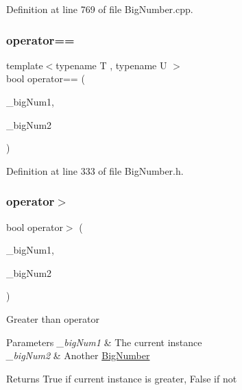 Definition at line 769 of file Big\+Number.\+cpp.

\mbox{\label{class_big_nums_1_1_big_number_add1b48504a6361ebffcef3c2b9fb5958}} 
\subsubsection{\texorpdfstring{operator==}{operator==}\hspace{0.1cm}{\footnotesize\ttfamily [2/2]}}
{\footnotesize\ttfamily template$<$typename T , typename U $>$ \\
bool operator== (\begin{DoxyParamCaption}\item[{const T \&}]{\+\_\+big\+Num1,  }\item[{const U \&}]{\+\_\+big\+Num2 }\end{DoxyParamCaption})\hspace{0.3cm}{\ttfamily [friend]}}



Definition at line 333 of file Big\+Number.\+h.

\mbox{\label{class_big_nums_1_1_big_number_a73fd242189f8c8439d4f001681d1ae51}} 
\subsubsection{\texorpdfstring{operator$>$}{operator>}}
{\footnotesize\ttfamily bool operator$>$ (\begin{DoxyParamCaption}\item[{const \mbox{\hyperlink{class_big_nums_1_1_big_number}{Big\+Number}} \&}]{\+\_\+big\+Num1,  }\item[{const \mbox{\hyperlink{class_big_nums_1_1_big_number}{Big\+Number}} \&}]{\+\_\+big\+Num2 }\end{DoxyParamCaption})\hspace{0.3cm}{\ttfamily [friend]}}

Greater than operator 
\begin{DoxyParams}{Parameters}
{\em \+\_\+big\+Num1} & The current instance \\
\hline
{\em \+\_\+big\+Num2} & Another \mbox{\hyperlink{class_big_nums_1_1_big_number}{Big\+Number}} \\
\hline
\end{DoxyParams}
\begin{DoxyReturn}{Returns}
True if current instance is greater, False if not 
\end{DoxyReturn}
\mbox{\label{class_big_nums_1_1_big_number_aa64caabb2b7a6a9bc6fc28e1abf961e3}} 
